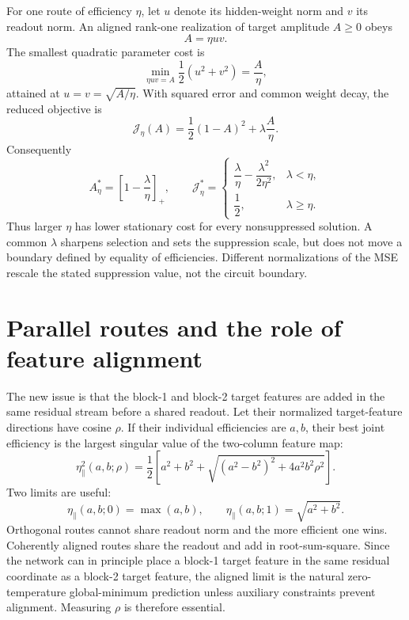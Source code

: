 \documentclass[11pt]{article}
\begin{document}
For one route of efficiency \(\eta\), let \(u\) denote its hidden-weight norm and \(v\) its
readout norm.  An aligned rank-one realization of target amplitude \(A\geq0\) obeys
\begin{equation}
A=\eta uv.
\end{equation}
The smallest quadratic parameter cost is
\begin{equation}
\min_{\eta uv=A}\frac12(u^2+v^2)=\frac{A}{\eta},
\label{eq:one-route-cost}
\end{equation}
attained at \(u=v=\sqrt{A/\eta}\).  With squared error and common weight decay, the reduced
objective is
\begin{equation}
\mathcal J_\eta(A)=\frac12(1-A)^2+\lambda\frac{A}{\eta}.
\end{equation}
Consequently
\begin{equation}
A_\eta^*=\left[1-\frac{\lambda}{\eta}\right]_+,
\qquad
\mathcal J_\eta^*=
\begin{cases}
\dfrac{\lambda}{\eta}-\dfrac{\lambda^2}{2\eta^2},&\lambda<\eta,\\[4pt]
\dfrac12,&\lambda\geq\eta.
\end{cases}
\label{eq:amplitude}
\end{equation}
Thus larger \(\eta\) has lower stationary cost for every nonsuppressed solution.  A common
\(\lambda\) sharpens selection and sets the suppression scale, but does not move a boundary
defined by equality of efficiencies.  Different normalizations of the MSE rescale the stated
suppression value, not the circuit boundary.

\section{Parallel routes and the role of feature alignment}

The new issue is that the block-1 and block-2 target features are added in the same residual
stream before a shared readout.  Let their normalized target-feature directions have cosine
\(\rho\).  If their individual efficiencies are \(a,b\), their best joint efficiency is the
largest singular value of the two-column feature map:
\begin{equation}
\eta_{\parallel}^2(a,b;\rho)=\frac12\left[a^2+b^2+
\sqrt{(a^2-b^2)^2+4a^2b^2\rho^2}\right].
\label{eq:parallel-general}
\end{equation}
Two limits are useful:
\begin{equation}
\eta_{\parallel}(a,b;0)=\max(a,b),
\qquad
\eta_{\parallel}(a,b;1)=\sqrt{a^2+b^2}.
\label{eq:parallel-limits}
\end{equation}
Orthogonal routes cannot share readout norm and the more efficient one wins.  Coherently aligned
routes share the readout and add in root-sum-square.  Since the network can in principle place a
block-1 target feature in the same residual coordinate as a block-2 target feature, the aligned
limit is the natural zero-temperature global-minimum prediction unless auxiliary constraints
prevent alignment.  Measuring \(\rho\) is therefore essential.
\end{document}
